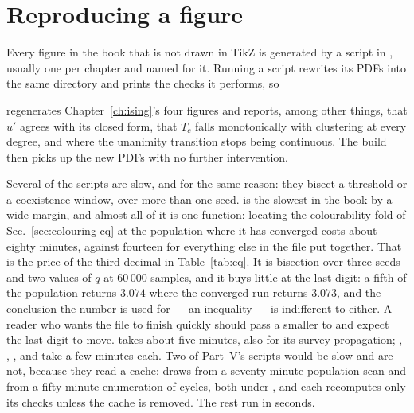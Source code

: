 \section*{Reproducing a figure}

Every figure in the book that is not drawn in TikZ is generated by a script in
, usually one per chapter and named for it. Running a
script rewrites its PDFs into the same
directory and prints the checks it performs, so
\begin{quote}
\end{quote}
regenerates Chapter~\ref{ch:ising}'s four figures and reports, among other
things, that $u'$ agrees with its closed form, that $T_{c}$ falls monotonically
with clustering at every degree, and where the unanimity transition stops being
continuous. The build then picks up the new PDFs with no further intervention.

Several of the scripts are slow, and for the same reason: they bisect a
threshold or a coexistence window, over more than one seed.
 is the slowest in the book by
a wide margin, and almost all of it is one function: locating the
colourability fold of Sec.~\ref{sec:colouring-cq} at the population where it
has converged costs about eighty minutes, against fourteen for everything else
in the file put together. That is the price of the third decimal in
Table~\ref{tab:cq}. It is bisection over three seeds and two values of $q$ at
$60\,000$ samples, and it buys little at the last digit: a fifth of the
population returns $3.074$ where the converged run returns $3.073$, and the
conclusion the number is used for --- an inequality --- is indifferent to
either. A reader who wants the file to finish quickly should pass a smaller
 to  and
expect the last digit to move.
 takes about five minutes,
also for its survey propagation;
,
,
,
 and
 take a few minutes each.
Two of Part~V's scripts would be slow and are not, because they read a
cache:  draws from a
seventy-minute population scan and
 from a fifty-minute
enumeration of cycles, both under
, and each recomputes
only its checks unless the cache is removed. The rest run in seconds.
